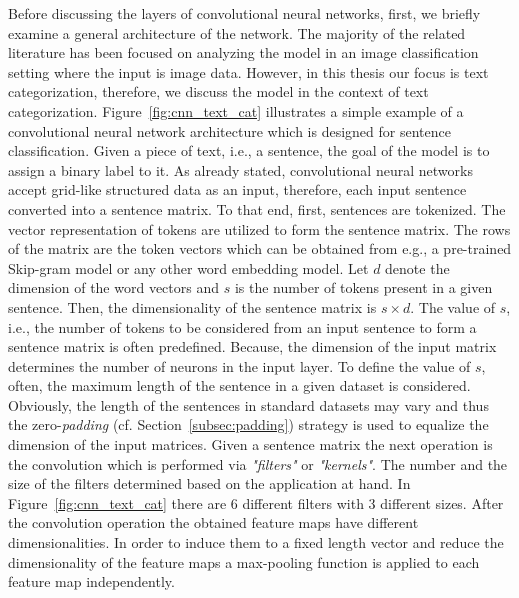 Before discussing the layers of convolutional neural networks, first, we briefly examine a general architecture of the network. The majority of the related literature has been focused on analyzing the model in an image classification setting where the input is image data. However, in this thesis our focus is text categorization, therefore, we discuss the model in the context of text categorization. %
Figure~\ref{fig:cnn_text_cat} illustrates a simple example of a convolutional neural network architecture which is designed for sentence classification. Given a piece of text, i.e., a sentence, the goal of the model is to assign a binary label to it. As already stated, convolutional neural networks accept grid-like structured data as an input, therefore, each input sentence converted into a sentence matrix. To that end, first, sentences are tokenized. The vector representation of tokens are utilized to form the sentence matrix. %
The rows of the matrix are the token vectors which can be obtained from e.g., a pre-trained Skip-gram model or any other word embedding model. Let $d$ denote the dimension of the word vectors and $s$ is the number of tokens present in a given sentence. Then, the dimensionality of the sentence matrix is $s\times d$. The value of $s$, i.e., the number of tokens to be considered from an input sentence to form a sentence matrix is often predefined. Because, the dimension of the input matrix determines the number of neurons in the input layer. To define the value of $s$, often, the maximum length of the sentence in a given dataset is considered. Obviously, the length of the sentences in standard datasets may vary and thus the zero-\textit{padding} (cf. Section~\ref{subsec:padding}) strategy is used to equalize the dimension of the input matrices.  
Given a sentence matrix the next operation is the convolution which is performed via \textit{"filters"} or \textit{"kernels"}. The number and the size of the filters determined based on the application at hand. In Figure~\ref{fig:cnn_text_cat} there are 6 different filters with 3 different sizes. After the convolution operation the obtained feature maps have different dimensionalities. In order to induce them to a fixed length vector and reduce the dimensionality of the feature maps a max-pooling function is applied to each feature map independently.  
